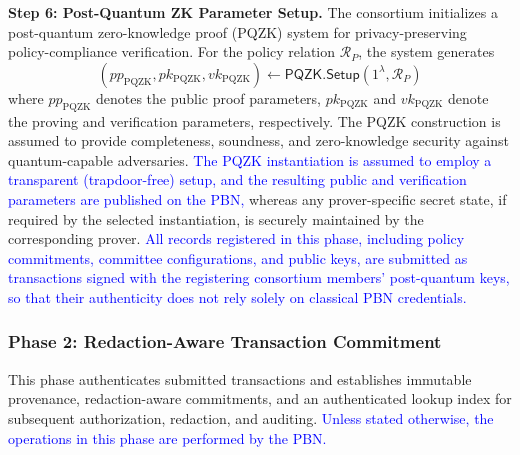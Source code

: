 \documentclass[lettersize,journal]{IEEEtran}
\begin{document}
\textbf{Step 6: Post-Quantum ZK Parameter Setup.}
The consortium initializes a post-quantum zero-knowledge proof
(PQZK) system for privacy-preserving policy-compliance verification.
For the policy relation $\mathcal{R}_{P}$, the system generates
\begin{equation}
(pp_{\mathrm{PQZK}},pk_{\mathrm{PQZK}},vk_{\mathrm{PQZK}})
\leftarrow
\mathsf{PQZK.Setup}(1^\lambda,\mathcal{R}_{P})
\end{equation}
where $pp_{\mathrm{PQZK}}$ denotes the public proof parameters,
$pk_{\mathrm{PQZK}}$ and $vk_{\mathrm{PQZK}}$ denote the proving and
verification parameters, respectively. The PQZK construction is
assumed to provide completeness, soundness, and zero-knowledge security
against quantum-capable adversaries.
\textcolor{blue}{The PQZK instantiation is assumed to employ a transparent
(trapdoor-free) setup, and the resulting public and verification
parameters are published on the PBN,}
whereas any prover-specific secret state, if required by the selected
instantiation, is securely maintained by the corresponding prover.
\textcolor{blue}{All records registered in this phase, including policy
commitments, committee configurations, and public keys, are submitted as
transactions signed with the registering consortium members'
post-quantum keys, so that their authenticity does not rely solely on
classical PBN credentials.}




\subsubsection*{\textbf{Phase 2: Redaction-Aware
Transaction Commitment}}

This phase authenticates submitted transactions and
establishes immutable provenance, redaction-aware
commitments, and an authenticated lookup index for
subsequent authorization, redaction, and auditing.
\textcolor{blue}{Unless stated otherwise, the operations in this phase
are performed by the PBN.}
\end{document}
